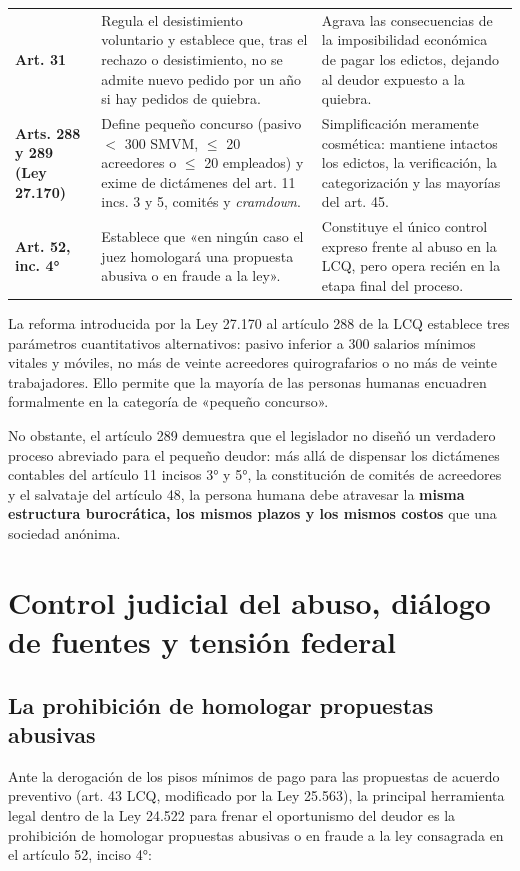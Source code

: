 \documentclass[12pt,oneside]{book}
\begin{document}
{\begin{longtable}{@{}>{\raggedright\arraybackslash}p{}>{\raggedright\arraybackslash}p{}>{\raggedright\arraybackslash}p{}@{}}
\addlinespace
\textbf{Art. 31} & Regula el desistimiento voluntario y establece que, tras el rechazo o desistimiento, no se admite nuevo pedido por un año si hay pedidos de quiebra. & Agrava las consecuencias de la imposibilidad económica de pagar los edictos, dejando al deudor expuesto a la quiebra. \\
\addlinespace
\textbf{Arts. 288 y 289 (Ley 27.170)} & Define pequeño concurso (pasivo $<$ 300 SMVM, $\leq$ 20 acreedores o $\leq$ 20 empleados) y exime de dictámenes del art. 11 incs. 3 y 5, comités y \textit{cramdown}. & Simplificación meramente cosmética: mantiene intactos los edictos, la verificación, la categorización y las mayorías del art. 45. \\
\addlinespace
\textbf{Art. 52, inc. 4°} & Establece que «en ningún caso el juez homologará una propuesta abusiva o en fraude a la ley». & Constituye el único control expreso frente al abuso en la LCQ, pero opera recién en la etapa final del proceso. \\
\end{longtable}
}

La reforma introducida por la Ley 27.170 al artículo 288 de la LCQ establece tres parámetros cuantitativos alternativos: pasivo inferior a 300 salarios mínimos vitales y móviles, no más de veinte acreedores quirografarios o no más de veinte trabajadores. Ello permite que la mayoría de las personas humanas encuadren formalmente en la categoría de «pequeño concurso».

No obstante, el artículo 289 demuestra que el legislador no diseñó un verdadero proceso abreviado para el pequeño deudor: más allá de dispensar los dictámenes contables del artículo 11 incisos 3° y 5°, la constitución de comités de acreedores y el salvataje del artículo 48, la persona humana debe atravesar la \textbf{misma estructura burocrática, los mismos plazos y los mismos costos} que una sociedad anónima.

\section{Control judicial del abuso, diálogo de fuentes y tensión federal}

\subsection{La prohibición de homologar propuestas abusivas}

Ante la derogación de los pisos mínimos de pago para las propuestas de acuerdo preventivo (art. 43 LCQ, modificado por la Ley 25.563), la principal herramienta legal dentro de la Ley 24.522 para frenar el oportunismo del deudor es la prohibición de homologar propuestas abusivas o en fraude a la ley consagrada en el artículo 52, inciso 4°:
\end{document}
